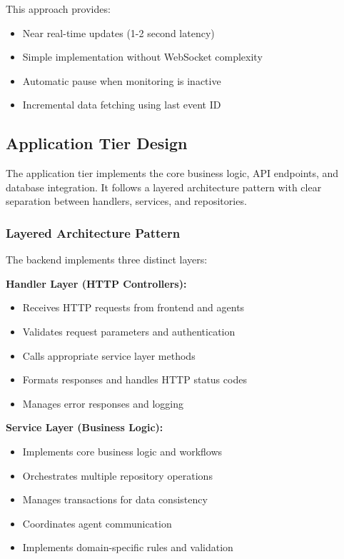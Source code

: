This approach provides:
\begin{itemize}
    \item Near real-time updates (1-2 second latency)
    \item Simple implementation without WebSocket complexity
    \item Automatic pause when monitoring is inactive
    \item Incremental data fetching using last event ID
\end{itemize}

\subsection{Application Tier Design}

The application tier implements the core business logic, API endpoints, and database integration. It follows a layered architecture pattern with clear separation between handlers, services, and repositories.

\subsubsection{Layered Architecture Pattern}

The backend implements three distinct layers:

\textbf{Handler Layer (HTTP Controllers):}
\begin{itemize}
    \item Receives HTTP requests from frontend and agents
    \item Validates request parameters and authentication
    \item Calls appropriate service layer methods
    \item Formats responses and handles HTTP status codes
    \item Manages error responses and logging
\end{itemize}

\textbf{Service Layer (Business Logic):}
\begin{itemize}
    \item Implements core business logic and workflows
    \item Orchestrates multiple repository operations
    \item Manages transactions for data consistency
    \item Coordinates agent communication
    \item Implements domain-specific rules and validation
\end{itemize}

